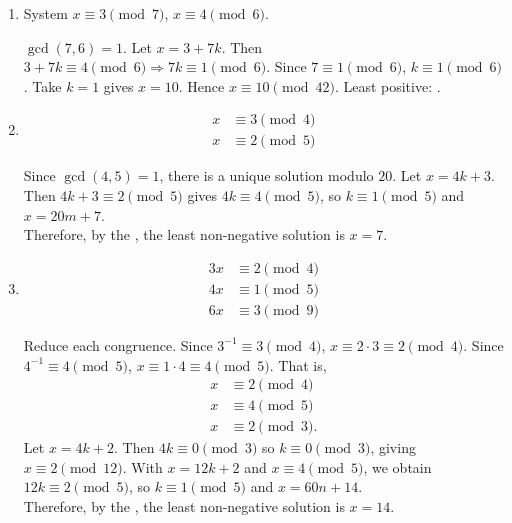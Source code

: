 \documentclass[11pt]{article}
\begin{document}
\begin{enumerate}

  \item System $x\equiv3\pmod7$, $x\equiv4\pmod6$.
  \begin{subanswer}
    $\gcd(7,6)=1$. Let $x=3+7k$. Then $3+7k\equiv4\pmod6\Rightarrow7k\equiv1\pmod6$. Since $7\equiv1\pmod6$, $k\equiv1\pmod6$. Take $k=1$ gives $x=10$. Hence $x\equiv10\pmod{42}$. Least positive: .
  \end{subanswer}
  
  \item 
  \begin{align*}
  x & \equiv 3 \pmod{4} \\
  x & \equiv 2 \pmod{5}
  \end{align*}
  \begin{subanswer}
    Since $\gcd(4,5)=1$, there is a unique solution modulo $20$. Let $x=4k+3$. 
    Then $4k+3\equiv 2\pmod{5}$ gives $4k\equiv 4\pmod{5}$, so $k\equiv 1\pmod{5}$ 
    and $x=20m+7$.\vspace*{10px}\\
    Therefore, by the , the least non-negative solution is $x=7$.
  \end{subanswer}

  \item 
  \begin{align*}
  3x & \equiv 2 \pmod{4} \\
  4x & \equiv 1 \pmod{5} \\
  6x & \equiv 3 \pmod{9}
  \end{align*}
  \begin{subanswer}
    Reduce each congruence. Since $3^{-1}\equiv 3\pmod{4}$, $x\equiv 2\cdot 3\equiv 2\pmod{4}$. 
    Since $4^{-1}\equiv 4\pmod{5}$, $x\equiv 1\cdot 4\equiv 4\pmod{5}$. That is,
    \begin{align*}
    x & \equiv 2 \pmod{4} \\
    x & \equiv 4 \pmod{5} \\
    x & \equiv 2 \pmod{3}.
    \end{align*}
    Let $x=4k+2$. Then $4k\equiv 0\pmod{3}$ so $k\equiv 0\pmod{3}$, giving $x\equiv 2\pmod{12}$. 
    With $x=12k+2$ and $x\equiv 4\pmod{5}$, we obtain $12k\equiv 2\pmod{5}$, 
    so $k\equiv 1\pmod{5}$ and $x=60n+14$.\vspace*{10px}\\
    Therefore, by the , the least non-negative solution is $x=14$.
  \end{subanswer}
\end{enumerate}
\end{document}
